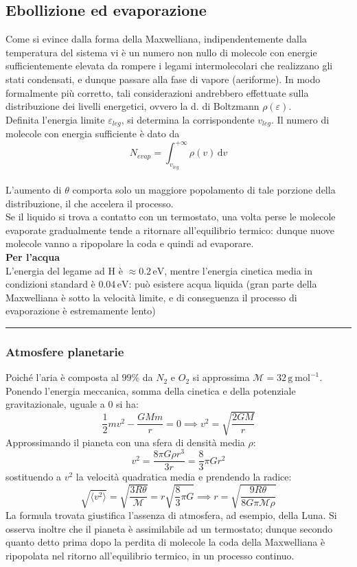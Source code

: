 \documentclass[10pt, oneside]{book}
\newcommand{\evolt}{\, \mathrm{eV}}
\newcommand{\molms}{\mathcal{M}}
\newcommand{\grams}[1]{\, \mathrm{g^{#1}}}
\newcommand{\mols}[1]{\, \mathrm{mol^{#1}}}
\newcommand{\mean}[1]{\langle #1 \rangle}
\newcommand{\infobox}[2]{\vspace{0.5cm}~\\ \textbf{#1} \hrulefill \vspace{0.2cm}\\#2 {}\,\\\hrule \vspace{0.5cm}}
\newcommand{\ds}{\displaystyle}
\newcommand{\integral}[4]{\int_{#1}^{#2} #3 \, \mathrm{d}#4}
\begin{document}
\subsection{Ebollizione ed evaporazione}
Come si evince dalla forma della Maxwelliana, indipendentemente dalla temperatura del sistema vi è un numero non nullo di molecole con energie sufficientemente elevata da rompere i legami intermolecolari che realizzano gli stati condensati, e dunque passare alla fase di vapore (aeriforme). In modo formalmente più corretto, tali considerazioni andrebbero effettuate sulla distribuzione dei livelli energetici, ovvero la d. di Boltzmann $\rho (\varepsilon)$.
\\Definita l'energia limite $\varepsilon_{leg}$, si determina la corrispondente $v_{leg}$. Il numero di molecole con energia sufficiente è dato da
\[N_{evap} = \integral{v_{leg}}{+\infty}{\rho(v)}{v}\]
\\L'aumento di $\theta$ comporta solo un maggiore popolamento di tale porzione della distribuzione, il che accelera il processo.
\\Se il liquido si trova a contatto con un termostato, una volta perse le molecole evaporate gradualmente tende a ritornare all'equilibrio termico: dunque nuove molecole vanno a ripopolare la coda e quindi ad evaporare.
\infobox{Per l'acqua}{L'energia del legame ad H è $\ds \approx 0.2 \evolt$, mentre l'energia cinetica media in condizioni standard è $0.04 \evolt$: può esistere acqua liquida (gran parte della Maxwelliana è sotto la velocità limite, e di conseguenza il processo di evaporazione è estremamente lento)}

\subsubsection{Atmosfere planetarie}
Poiché l'aria è composta al $99 \%$ da $N_2$ e $O_2$ si approssima $\mathcal{M} = 32 \grams{} \mols{-1}$. Ponendo l'energia meccanica, somma della cinetica e della potenziale gravitazionale, uguale a $0$ si ha:
\[\frac{1}{2} m v^2 - \frac{GM m}{r} = 0 \implies v^2 = \sqrt{\frac{2G M}{r}}\]
Approssimando il pianeta con una sfera di densità media $\rho$:
\[v^2 = \frac{8 \pi G \rho r^3}{3 r} = \frac{8}{3} \pi G r^2\]
sostituendo a $v^2$ la velocità quadratica media e prendendo la radice:
\[\sqrt{\mean{v^2}} = \sqrt{\frac{3 R \theta}{\molms}} = r \sqrt{\frac{8}{3} \pi G} \implies r = \sqrt{\frac{9 R \theta}{8 G \pi \molms \rho}}\]
La formula trovata giustifica l'assenza di atmosfera, ad esempio, della Luna. Si osserva inoltre che il pianeta è assimilabile ad un termostato; dunque secondo quanto detto prima dopo la perdita di molecole la coda della Maxwelliana è ripopolata nel ritorno all'equilibrio termico, in un processo continuo.
\end{document}

